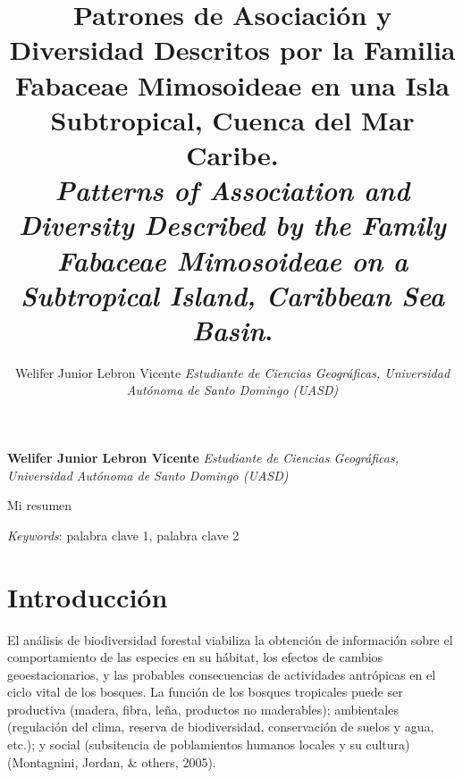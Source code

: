 \documentclass[11pt,]{article}
\title{Patrones de Asociación y Diversidad Descritos por la Familia Fabaceae
Mimosoideae en una Isla Subtropical, Cuenca del Mar Caribe.\\
\emph{Patterns of Association and Diversity Described by the Family
Fabaceae Mimosoideae on a Subtropical Island, Caribbean Sea Basin}.\\  }
\author{\Large Welifer Junior Lebron Vicente\vspace{0.05in} \newline\normalsize\emph{Estudiante de Ciencias Geográficas, Universidad Autónoma de Santo
Domingo (UASD)}  }
\date{}
\newcommand*{\authorfont}{\fontfamily{phv}\selectfont}
\renewenvironment{abstract}
 {{%
    \setlength{\leftmargin}{0mm}
    \setlength{\rightmargin}{\leftmargin}%
  }%
  \relax}
 {\endlist}
\begin{document}
	
%

{%
\setlength{\parindent}{0pt}
\thispagestyle{plain}
{\fontsize{18}{20}\selectfont\raggedright 
\maketitle  %

}

{
   \vskip 13.5pt\relax \normalsize\fontsize{11}{12} 
\textbf{\authorfont Welifer Junior Lebron Vicente} \hskip 15pt \emph{\small Estudiante de Ciencias Geográficas, Universidad Autónoma de Santo
Domingo (UASD)}   

}

}








\begin{abstract}

    \hbox{\vrule height .2pt width 39.14pc}

    \vskip 8.5pt %

\noindent Mi resumen


\vskip 8.5pt \noindent \emph{Keywords}: palabra clave 1, palabra clave 2 \par

    \hbox{\vrule height .2pt width 39.14pc}



\end{abstract}


\vskip 6.5pt


\noindent  \section{Introducción}\label{introducciuxf3n}

El análisis de biodiversidad forestal viabiliza la obtención de
información sobre el comportamiento de las especies en su hábitat, los
efectos de cambios geoestacionarios, y las probables consecuencias de
actividades antrópicas en el ciclo vital de los bosques. La función de
los bosques tropicales puede ser productiva (madera, fibra, leña,
productos no maderables); ambientales (regulación del clima, reserva de
biodiversidad, conservación de suelos y agua, etc.); y social
(subsitencia de poblamientos humanos locales y su cultura) (Montagnini,
Jordan, \& others, 2005).
\end{document}
